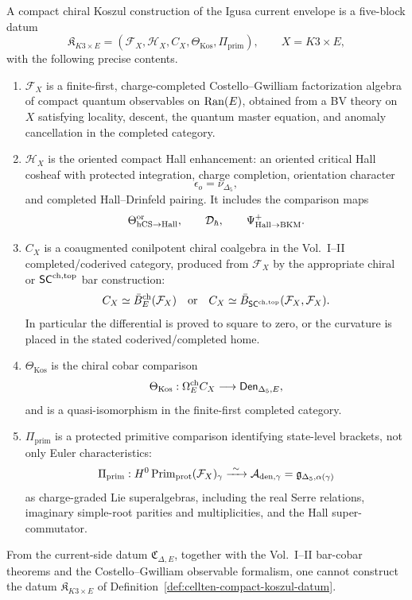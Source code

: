 \begin{definition}
\label{def:cellten-compact-koszul-datum}
A compact chiral Koszul construction of the Igusa current envelope is a
five-block datum
$$
\mathfrak K_{K3\times E}
=
\left(\mathcal F_X,\mathcal H_X,C_X,\Theta_{\mathrm{Kos}},\Pi_{\mathrm{prim}}\right),
\qquad X=K3\times E,
$$
with the following precise contents.
\begin{enumerate}
\item \(\mathcal F_X\) is a finite-first, charge-completed
Costello--Gwilliam factorization algebra of compact quantum observables
on \(\operatorname{Ran}(E)\), obtained from a BV theory on \(X\) satisfying locality,
descent, the quantum master equation, and anomaly cancellation in the
completed category.
\item \(\mathcal H_X\) is the oriented compact Hall enhancement:
an oriented critical Hall cosheaf with protected integration, charge
completion, orientation character
$$
\epsilon_o=\nu_{\Delta_5},
$$
and completed Hall--Drinfeld pairing.  It includes the comparison maps
$$
\Theta^{\mathrm{or}}_{\mathrm{hCS}\to\mathrm{Hall}},\qquad
\mathcal D_\hbar,\qquad
\Psi^+_{\mathrm{Hall}\to\mathrm{BKM}}.
$$
\item \(C_X\) is a coaugmented conilpotent chiral coalgebra in the
Vol.~I--II completed/coderived category, produced from
\(\mathcal F_X\) by the appropriate chiral or \(\mathsf{SC}^{\mathrm{ch,top}}\) bar
construction:
$$
C_X\simeq\bar B^{\mathrm{ch}}_E(\mathcal F_X)
\quad\hbox{or}\quad
C_X\simeq\bar B_{\mathsf{SC}^{\mathrm{ch,top}}}(\mathcal F_X,\mathcal F_X).
$$
In particular the differential is proved to square to zero, or the
curvature is placed in the stated coderived/completed home.
\item \(\Theta_{\mathrm{Kos}}\) is the chiral cobar comparison
$$
\Theta_{\mathrm{Kos}}:
\Omega^{\mathrm{ch}}_E C_X
\longrightarrow
\mathsf{Den}_{\Delta_5,E},
$$
and is a quasi-isomorphism in the finite-first completed category.
\item \(\Pi_{\mathrm{prim}}\) is a protected primitive comparison
identifying state-level brackets, not only Euler characteristics:
$$
\Pi_{\mathrm{prim}}:
H^0\operatorname{Prim}_{\mathrm{prot}}(\mathcal F_X)_\gamma
\xrightarrow{\ \sim\ }
\mathcal A_{\mathrm{den},\gamma}
=\mathfrak g_{\Delta_5,\alpha(\gamma)}
$$
as charge-graded Lie superalgebras, including the real Serre relations,
imaginary simple-root parities and multiplicities, and the Hall
super-commutator.
\end{enumerate}
\end{definition}

\begin{theorem}
\label{thm:cellten-typed-no-promotion}
From the current-side datum \(\mathfrak C_{\Delta,E}\), together with
the Vol.~I--II bar-cobar theorems and the Costello--Gwilliam observable
formalism, one cannot construct the datum
\(\mathfrak K_{K3\times E}\) of
Definition~\ref{def:cellten-compact-koszul-datum}.
\end{theorem}

